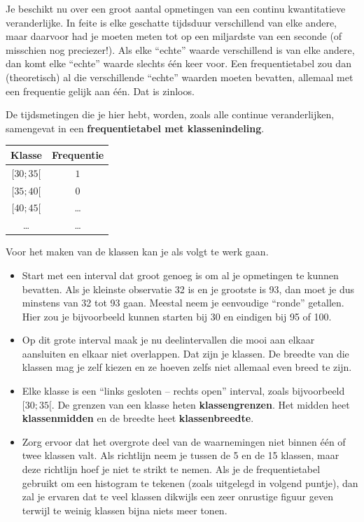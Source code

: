 \documentclass[12pt,twoside]{article}
\begin{document}
Je beschikt nu over een groot aantal opmetingen van een continu kwantitatieve veranderlijke. In feite is
elke geschatte tijdsduur verschillend van elke andere, maar daarvoor had je moeten meten tot op een
miljardste van een seconde (of misschien nog preciezer!). Als elke “echte” waarde verschillend is
van elke andere, dan komt elke “echte” waarde slechts één keer voor. Een frequentietabel zou dan
(theoretisch) al die verschillende “echte” waarden moeten bevatten, allemaal met een frequentie
gelijk aan één. Dat is zinloos.

De tijdsmetingen die je hier hebt, worden, zoals alle continue veranderlijken, samengevat in een
{\bf frequentietabel met klassenindeling}.

\begin{center}
  \begin{tabular}{|c|c|}
    \hline
    Klasse & Frequentie\\
    \hline
    $[30;35[$ & $1$\\    
    \hline
    $[35;40[$ & $0$\\
    \hline
    $[40;45[$ & \ldots\\ 
    \hline
    \ldots & \ldots\\ 
    \hline
  \end{tabular}
\end{center}

Voor het maken van de klassen kan je als volgt te werk gaan.
\begin{itemize}
  \item Start met een interval dat groot genoeg is om al je opmetingen te kunnen bevatten. Als je
kleinste observatie 32 is en je grootste is 93, dan moet je dus minstens van 32 tot 93 gaan.
Meestal neem je eenvoudige “ronde” getallen. Hier zou je bijvoorbeeld kunnen starten bij 30
en eindigen bij 95 of 100.
  \item Op dit grote interval maak je nu deelintervallen die mooi aan elkaar aansluiten en elkaar niet
overlappen. Dat zijn je klassen. De breedte van die klassen mag je zelf kiezen en ze hoeven
zelfs niet allemaal even breed te zijn.
  \item Elke klasse is een “links gesloten – rechts open” interval, zoals bijvoorbeeld $[30;35[$. De
grenzen van een klasse heten {\bf klassengrenzen}. Het midden heet {\bf klassenmidden} en de
breedte heet {\bf klassenbreedte}.
  \item Zorg ervoor dat het overgrote deel van de waarnemingen niet binnen één of twee klassen
valt. Als richtlijn neem je tussen de 5 en de 15 klassen, maar deze richtlijn hoef je niet te
strikt te nemen. Als je de frequentietabel gebruikt om een histogram te tekenen (zoals
uitgelegd in volgend puntje), dan zal je ervaren dat te veel klassen dikwijls een zeer onrustige
figuur geven terwijl te weinig klassen bijna niets meer tonen.
\end{itemize}
\end{document}
